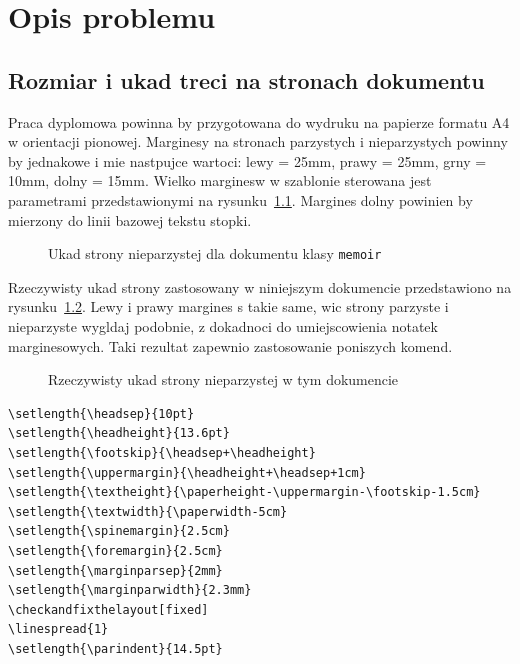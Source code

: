 \chapter{Opis problemu}
\section{Rozmiar i ukad treci na stronach dokumentu}
Praca dyplomowa powinna by przygotowana do wydruku na papierze formatu A4 w orientacji pionowej.
Marginesy na stronach parzystych i nieparzystych powinny by jednakowe i mie nastpujce wartoci:
lewy = 25mm, prawy = 25mm, grny = 10mm, dolny = 15mm. Wielko marginesw w szablonie sterowana jest parametrami przedstawionymi na rysunku~\ref{fig:pageLayout}. Margines dolny powinien by mierzony do linii bazowej tekstu stopki.
\begin{figure}[htb]
\currentpage
\drawparameterstrue
\oddpagelayoutfalse
\drawstock
\caption{Ukad strony nieparzystej dla dokumentu klasy \texttt{memoir}} \label{fig:pageLayout}
\end{figure}

Rzeczywisty ukad strony zastosowany w niniejszym dokumencie przedstawiono na rysunku~\ref{fig:currentPageLayout}. Lewy i prawy margines s takie same, wic strony parzyste i nieparzyste wygldaj podobnie, z dokadnoci do umiejscowienia notatek marginesowych. Taki rezultat zapewnio zastosowanie poniszych komend. 
\begin{figure}[t]
\currentstock
\oddpagelayouttrue
\twocolumnlayoutfalse
\drawmarginparstrue
\drawparametersfalse
\drawstock
\caption{Rzeczywisty ukad strony nieparzystej w tym dokumencie} \label{fig:currentPageLayout}
\end{figure}

\begin{lstlisting}[basicstyle=\footnotesize\ttfamily]
\setlength{\headsep}{10pt} 
\setlength{\headheight}{13.6pt} 
\setlength{\footskip}{\headsep+\headheight}
\setlength{\uppermargin}{\headheight+\headsep+1cm}
\setlength{\textheight}{\paperheight-\uppermargin-\footskip-1.5cm}
\setlength{\textwidth}{\paperwidth-5cm}
\setlength{\spinemargin}{2.5cm}
\setlength{\foremargin}{2.5cm}
\setlength{\marginparsep}{2mm}
\setlength{\marginparwidth}{2.3mm}
\checkandfixthelayout[fixed] 
\linespread{1}
\setlength{\parindent}{14.5pt}
\end{lstlisting}




